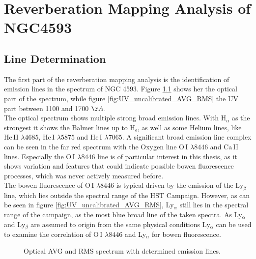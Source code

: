 \chapter{Reverberation Mapping Analysis of NGC4593}
\label{cap: Results}

\section{Line Determination}

 The first part of the reverberation mapping analysis is the identification of emission lines in the spectrum of NGC 4593. Figure \ref{fig:AVG_RMS_SPECTRUM} shows her the optical part of the spectrum, while figure \ref{fig:UV_uncalibrated_AVG_RMS} the UV part between 1100 and 1700 $\AA$. \\
 The optical spectrum shows multiple strong broad emission lines. With H$_\alpha$ as the strongest it shows the Balmer lines up to H$_\epsilon$, as well as some Helium lines, like He\,II $\lambda 4685$, He\,I $\lambda 5875$ and He\,I $\lambda 7065$. A significant broad emission line complex can be seen in the far red spectrum with the Oxygen line O\,I $\lambda 8446$ and Ca\,II lines. Especially the O\,I $\lambda 8446$ line is of particular interest in this thesis, as it shows variation and features that could indicate possible bowen fluorescence processes, which was never actively measured before.\\
 The bowen fluorescence of O\,I $\lambda 8446$ is typical driven by the emission of the Ly$_\beta$ line, which lies outside the spectral range of the HST Campaign. However, as can be seen in figure \ref{fig:UV_uncalibrated_AVG_RMS}, Ly$_\alpha$  still lies in the spectral range of the campaign, as the most blue broad line of the taken spectra. As Ly$_\alpha$ and Ly$_\beta$ are assumed to origin from the same physical conditions Ly$_\alpha$ can be used to examine the correlation of O\,I $\lambda 8446$ and Ly$_\alpha$ for bowen fluorescence.
 
 
\begin{figure}[!htbp]
	\centering
	\caption{Optical AVG and RMS spectrum with determined emission lines.}
	\label{fig:AVG_RMS_SPECTRUM}
\end{figure}

